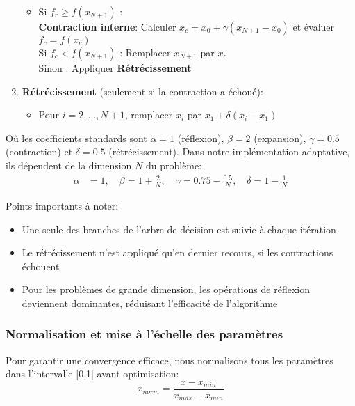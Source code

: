 \begin{enumerate}
\begin{itemize}
   \item Si $f_r \geq f(x_{N+1})$ : \\
         \textbf{Contraction interne}: Calculer $x_c = x_0 + \gamma(x_{N+1} - x_0)$ et évaluer $f_c = f(x_c)$ \\
         Si $f_c < f(x_{N+1})$ : Remplacer $x_{N+1}$ par $x_c$ \\
         Sinon : Appliquer \textbf{Rétrécissement}
   \end{itemize}

\item \textbf{Rétrécissement} (seulement si la contraction a échoué):
   \begin{itemize}
   \item Pour $i = 2, \ldots, N+1$, remplacer $x_i$ par $x_1 + \delta(x_i - x_1)$
   \end{itemize}
\end{enumerate}

Où les coefficients standards sont $\alpha = 1$ (réflexion), $\beta = 2$ (expansion), $\gamma = 0.5$ (contraction) et $\delta = 0.5$ (rétrécissement). Dans notre implémentation adaptative, ils dépendent de la dimension $N$ du problème:
\begin{align}
\alpha &= 1, \quad \beta = 1 + \frac{2}{N}, \quad \gamma = 0.75 - \frac{0.5}{N}, \quad \delta = 1 - \frac{1}{N}
\end{align}

Points importants à noter:
\begin{itemize}
    \item Une seule des branches de l'arbre de décision est suivie à chaque itération
    \item Le rétrécissement n'est appliqué qu'en dernier recours, si les contractions échouent
    \item Pour les problèmes de grande dimension, les opérations de réflexion deviennent dominantes, réduisant l'efficacité de l'algorithme
\end{itemize}

\subsubsection{Normalisation et mise à l'échelle des paramètres}

Pour garantir une convergence efficace, nous normalisons tous les paramètres dans l'intervalle [0,1] avant optimisation:
\begin{equation}
x_{norm} = \frac{x - x_{min}}{x_{max} - x_{min}}
\end{equation}

